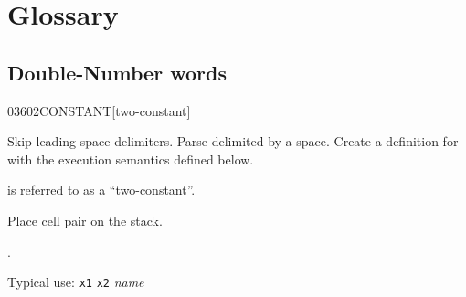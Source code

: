 \section{Glossary} %

\subsection{Double-Number words} %

\begin{worddef}{0360}{2CONSTANT}[two-constant]
\item {}

	Skip leading space delimiters. Parse  delimited by
	a space. Create a definition for  with the execution
	semantics defined below.

	 is referred to as a ``two-constant''.

\execute[name]

	Place cell pair  on the stack.

\see {}.

	\begin{rationale} %
		Typical use:
			\texttt{x1} \texttt{x2}  \emph{name}
	\end{rationale}

	\begin{testing}
	\cbstart{}
		 \\

		 \\

		 \\
		 \\
	\cbend
	\end{testing}
\end{worddef}


